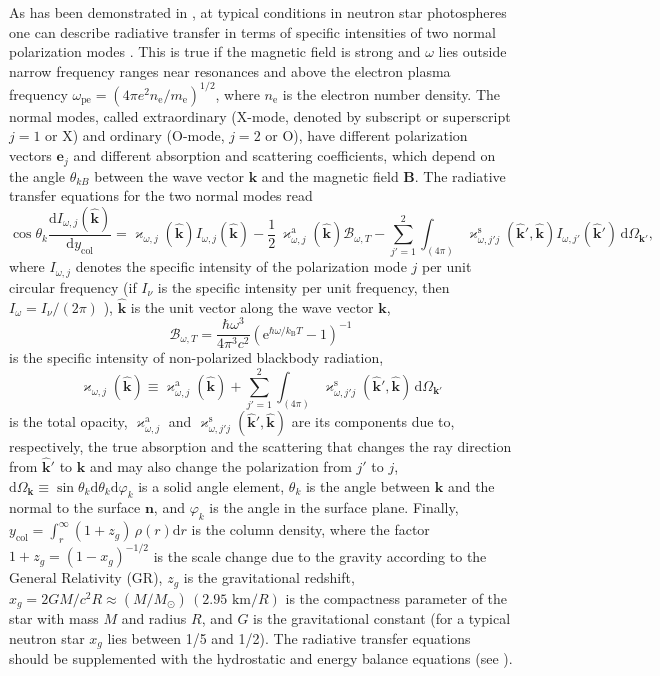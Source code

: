 \documentclass{pos1}
\newcommand{\beq}{\begin{equation}}
\newcommand{\eeq}{\end{equation}}
\newcommand{\dd}{\mathrm{d}}
\newcommand{\kB}{k_\mathrm{B}}
\newcommand{\khat}{\hat{\mathbf{k}}}
\newcommand{\mel}{m_\mathrm{e}}
\newcommand{\nel}{n_\mathrm{e}}
\newcommand{\Omk}[1]{\Omega_{#1}}
\newcommand{\ompe}{\omega_{\mathrm{pe}}}
\newcommand{\opac}{\varkappa}
\newcommand{\ycol}{y_\mathrm{col}}
\begin{document}
As has been demonstrated in \cite{GP73}, at typical conditions in
neutron star photospheres one can describe radiative transfer in
terms of specific intensities of two normal polarization modes
\cite{Ginzburg}. This is true if the magnetic field is strong and
$\omega$ lies outside narrow
frequency ranges near resonances and above the electron plasma
frequency $ \ompe=\left({4\pi e^2 \nel / \mel } \right)^{1/2}$, where
$\nel$ is the electron number density. The normal modes, called
extraordinary (X-mode, denoted by subscript or superscript $j=1$ or
X) and ordinary (O-mode, $j=2$ or O), have different polarization vectors
$\bm{e}_j$ and different absorption and scattering coefficients, which
depend on the angle $\theta_{kB}$ between the wave vector $\bm{k}$ and
the magnetic field $\bm{B}$. The radiative transfer equations for the
two normal modes read \cite{KaminkerPS82}
\beq
 \cos\theta_k \frac{\dd I_{\omega,j}(\khat)}{\dd \ycol} =
    \opac_{\omega,j}(\khat) I_{\omega,j}(\khat) 
-
 \frac12\,\opac_{\omega,j}^\mathrm{a}(\khat)
     \mathcal{B}_{\omega,T}
-
      \sum_{j'=1}^2 \int_{(4\pi)} 
        \opac_{\omega,j'j}^\mathrm{s}(\khat',\khat)
         I_{\omega,j'}(\khat') \,\dd\Omk{\bm{k}'},
\label{RTEmag}
\eeq
where $I_{\omega,j}$ denotes the specific intensity  of the
polarization mode $j$ per unit circular frequency (if $I_\nu$ is the
specific intensity per unit frequency, then $I_\omega=I_\nu/(2\pi)$
\cite{Zheleznyakov}), $\khat$ is the unit vector along the wave vector
$\bm{k}$,
\beq
\mathcal{B}_{\omega,T} = 
\frac{\hbar\omega^3}{4\pi^3c^2}
\left(\mathrm{e}^{\hbar\omega/ \kB T}-1\right)^{-1}
\label{Planck}
\eeq
is the specific intensity of non-polarized blackbody
radiation,
\beq
\opac_{\omega,j}(\khat) \equiv
\opac_{\omega,j}^\mathrm{a}(\khat) + \sum_{j'=1}^2
\int_{(4\pi)}
\opac_{\omega,j'j}^\mathrm{s}(\khat',\khat)\,\dd\Omk{\bm{k}'}
\eeq
is the total opacity, $\opac_{\omega,j}^\mathrm{a}$ and
$\opac_{\omega,j'j}^\mathrm{s}(\khat',\khat)$ are its components due
to, respectively, the true absorption and the scattering that changes
the ray direction from $\khat'$ to $\khat$ and may also change the
polarization from $j'$ to $j$, $\dd\Omk{\bm{k}} \equiv
\sin\theta_{k}\dd\theta_{k}\dd\varphi_{k}$ is a solid angle element,
$\theta_k$ is the angle between $\bm{k}$ and the normal to the
surface $\mathbf{n}$, and $\varphi_k$ is the angle in the surface
plane. Finally,
$\ycol = \int_r^\infty (1+z_g)\,\rho(r)\dd r$ is the column density,
where the factor $1+z_g= (1-x_g)^{-1/2}$ is the scale change
due to the gravity according to the General Relativity (GR), $z_g$ is
the gravitational redshift, 
$x_g=2{GM}/{c^2 R}\approx(M/M_\odot)\,(\mbox{2.95 km}/R)$
is the compactness parameter
of the star with mass $M$ and radius $R$, and $G$ is the gravitational
constant (for a typical neutron star $x_g$ lies between 1/5 and 1/2).
The radiative transfer equations should be supplemented with the
hydrostatic and energy balance equations (see
\cite{SuleimanovPouW12}).
\end{document}
